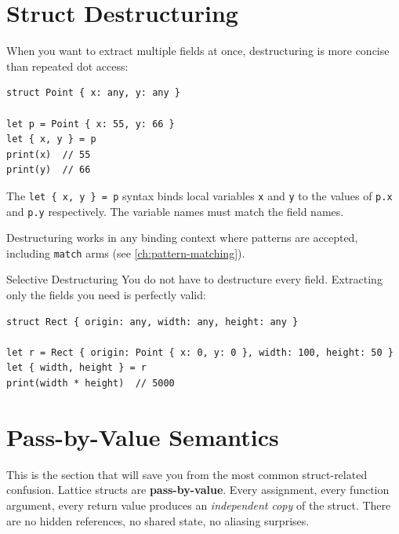 \section{Struct Destructuring}\label{sec:struct-destructuring}

When you want to extract multiple fields at once, destructuring is more
concise than repeated dot access:

\begin{lstlisting}[language=Lattice, caption={Struct destructuring}]
struct Point { x: any, y: any }

let p = Point { x: 55, y: 66 }
let { x, y } = p
print(x)  // 55
print(y)  // 66
\end{lstlisting}

The \lstinline|let { x, y } = p| syntax binds local variables
\lstinline|x| and \lstinline|y| to the values of
\lstinline|p.x| and \lstinline|p.y| respectively. The variable names must
match the field names.

Destructuring works in any binding context where patterns are accepted,
including \lstinline|match| arms (see \cref{ch:pattern-matching}).

\begin{tipbox}{Selective Destructuring}
You do not have to destructure every field. Extracting only the fields you
need is perfectly valid:

\begin{lstlisting}[language=Lattice]
struct Rect { origin: any, width: any, height: any }

let r = Rect { origin: Point { x: 0, y: 0 }, width: 100, height: 50 }
let { width, height } = r
print(width * height)  // 5000
\end{lstlisting}
\end{tipbox}

\section{Pass-by-Value Semantics}\label{sec:struct-pass-by-value}

This is the section that will save you from the most common struct-related
confusion. Lattice structs are \textbf{pass-by-value}. Every assignment,
every function argument, every return value produces an \emph{independent
copy} of the struct. There are no hidden references, no shared state, no
aliasing surprises.

